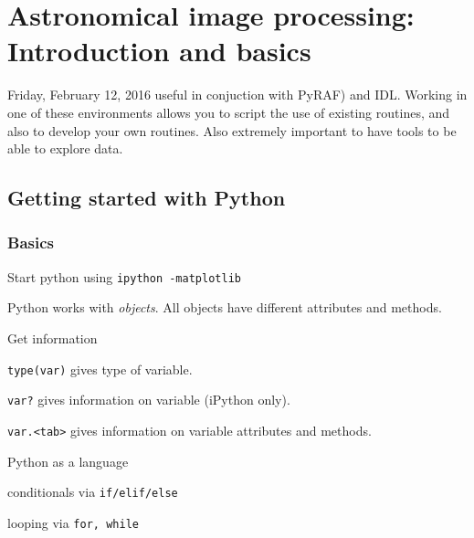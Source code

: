 \documentclass{article}
\begin{document}
\section*{Astronomical image processing: Introduction and basics}
\textcolor{date}{Friday, February 12, 2016}
useful in conjuction with PyRAF) and IDL\@. Working in one of these
environments allows you to script the use of existing routines, and
also to develop your own routines. Also extremely important to have
tools to be able to explore data.

\subsection*{Getting started with Python}
\subsubsection*{Basics}
\begin{itemize*}
    \item Start python using \verb|ipython -matplotlib|
    \item Python works with \emph{objects}. All objects have different
        attributes and methods.
    \item Get information
        \begin{itemize*}
            \item \verb|type(var)| gives type of variable.
            \item \verb|var?| gives information on variable (iPython
                only).
            \item \verb|var.<tab>| gives information on variable
                attributes and methods.
        \end{itemize*}
    \item Python as a language
        \begin{itemize*}
            \item conditionals via \verb|if/elif/else|
            \item looping via \verb|for, while|
        \end{itemize*}
\end{itemize*}
\end{document}
